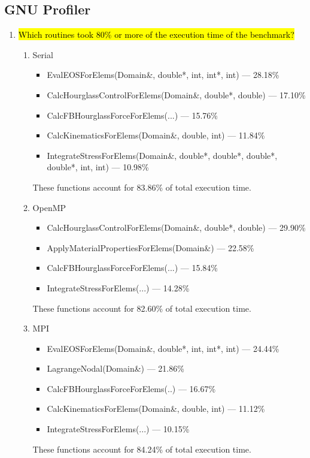 \documentclass{article}
\begin{document}
\subsection{GNU Profiler} %
\begin{enumerate}
	\item \hl{Which routines took 80\% or more of the execution time of the benchmark?}

	\begin{enumerate}
		\item Serial
		\begin{itemize}
			\item EvalEOSForElems(Domain\&, double*, int, int*, int) --- 28.18\%
			\item CalcHourglassControlForElems(Domain\&, double*, double) --- 17.10\% 
			\item CalcFBHourglassForceForElems(...) --- 15.76\%
			\item CalcKinematicsForElems(Domain\&, double, int) --- 11.84\%
			\item IntegrateStressForElems(Domain\&, double*, double*, double*, double*, int, int) --- 10.98\%
		\end{itemize}
		These functions account for 83.86\% of total execution time.

		\item OpenMP
		\begin{itemize}
			\item CalcHourglassControlForElems(Domain\&, double*, double) --- 29.90\%
			\item ApplyMaterialPropertiesForElems(Domain\&) --- 22.58\%
			\item CalcFBHourglassForceForElems(...) --- 15.84\%
			\item IntegrateStressForElems(...) --- 14.28\%
		\end{itemize}
		These functions account for 82.60\% of total execution time.
		\vspace{1mm}

		\item MPI
		\begin{itemize}
			\item EvalEOSForElems(Domain\&, double*, int, int*, int) --- 24.44\%
			\item LagrangeNodal(Domain\&) --- 21.86\%
			\item CalcFBHourglassForceForElems(..) --- 16.67\%
			\item CalcKinematicsForElems(Domain\&, double, int) --- 11.12\%
			\item IntegrateStressForElems(...) --- 10.15\%
		\end{itemize}
		These functions account for 84.24\% of total execution time.


\end{enumerate}
\end{enumerate}
\end{document}
